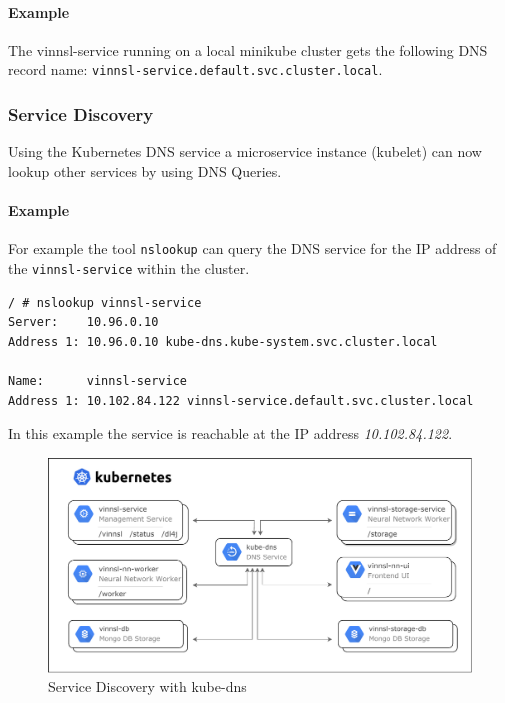 \paragraph{Example}\label{example}

The vinnsl-service running on a local minikube cluster gets the
following DNS record name:
\texttt{vinnsl-service.default.svc.cluster.local}.

\subsubsection{Service Discovery}\label{service-discovery}

Using the Kubernetes DNS service a microservice instance (kubelet) can
now lookup other services by using DNS Queries.

\paragraph{Example}\label{example-1}

For example the tool \texttt{nslookup} can query the DNS service for the
IP address of the \texttt{vinnsl-service} within the cluster.

\begin{verbatim}
/ # nslookup vinnsl-service
Server:    10.96.0.10
Address 1: 10.96.0.10 kube-dns.kube-system.svc.cluster.local

Name:      vinnsl-service
Address 1: 10.102.84.122 vinnsl-service.default.svc.cluster.local
\end{verbatim}

In this example the service is reachable at the IP address
\emph{10.102.84.122}.

\begin{figure}
\centering
\includegraphics[width=15.00000cm]{images/overview_main_services}
\caption{Service Discovery with kube-dns \label{img.service-discovery}}
\end{figure}

